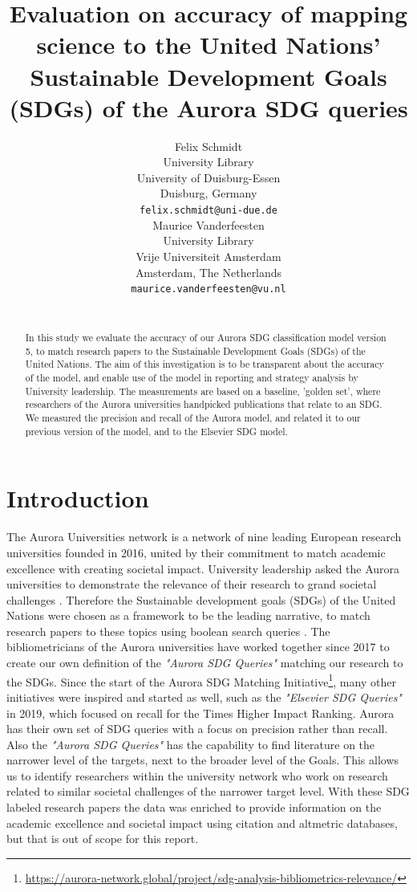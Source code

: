 \documentclass{article}
\title{Evaluation on accuracy of mapping science to the United Nations' Sustainable Development Goals (SDGs) of the Aurora SDG queries}
\author{
  Felix Schmidt \\
  University Library\\
  University of Duisburg-Essen\\
  Duisburg, Germany\\
  \texttt{felix.schmidt@uni-due.de} \\
   \And
Maurice Vanderfeesten \\
  University Library\\
  Vrije Universiteit Amsterdam\\
  Amsterdam, The Netherlands \\
  \texttt{maurice.vanderfeesten@vu.nl} \\
  \orcid{0000-0002-5119-3514}\\
}
\begin{document}
\maketitle

\begin{abstract}
In this study we evaluate the accuracy of our Aurora SDG classification model version 5, to match research papers to the Sustainable Development Goals (SDGs) of the United Nations. The aim of this investigation is to be transparent about the accuracy of the model, and enable use of the model in reporting and strategy analysis by University leadership. The measurements are based on a baseline, 'golden set', where researchers of the Aurora universities handpicked publications that relate to an SDG. We measured the precision and recall of the Aurora model, and related it to our previous version of the model, and to the Elsevier SDG model. 
\end{abstract}




\section{Introduction}
The Aurora Universities network is a network of nine leading European research universities founded in 2016, united by their commitment to match academic excellence with creating societal impact. University leadership asked the Aurora universities to demonstrate the relevance of their research to grand societal challenges \cite{vanderfeesten_societal_2017, drooge_evaluating_2010, carley_social_2019}. Therefore the Sustainable development goals (SDGs) of the United Nations were chosen as a framework to be the leading narrative, to match research papers to these topics using boolean search queries \cite{armitage_mapping_2020}. The bibliometricians of the Aurora universities have worked together since 2017 to create our own definition of the \emph{"Aurora SDG Queries"} matching our research to the SDGs. Since the start of the Aurora SDG Matching Initiative\footnote{\url{https://aurora-network.global/project/sdg-analysis-bibliometrics-relevance/}}, many other initiatives were inspired and started as well, such as the \emph{"Elsevier SDG Queries"} \cite{jayabalasingham_identifying_2019}  in 2019, which focused on recall for the Times Higher Impact Ranking. Aurora has their own set of SDG queries with a focus on precision rather than recall. Also the \emph{"Aurora SDG Queries"} has the capability to find literature on the narrower level of the targets, next to the broader level of the Goals. This allows us to identify researchers within the university network who work on research related to similar societal challenges of the narrower target level.  With these SDG labeled research papers the data was enriched to provide information on the academic excellence and societal impact \cite{bornmann_what_2013} using citation and altmetric databases, but that is out of scope for this report. 
\end{document}
